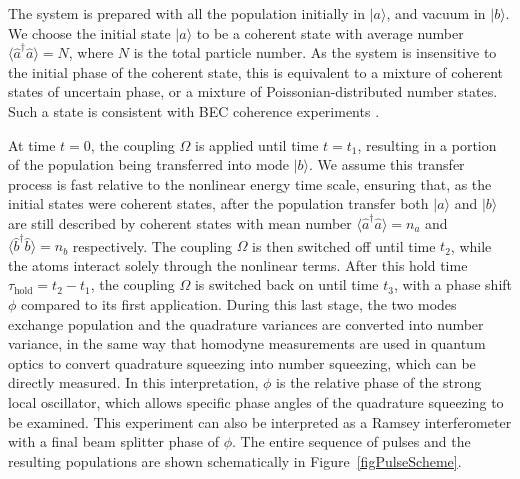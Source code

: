 \documentclass{iopart}
\begin{document}

The system is prepared with all the population initially in $|a\rangle$, and vacuum in $|b\rangle$. We choose the initial state $|a\rangle$ to be a coherent state with average number $\langle \hat{a}^{\dagger} \hat{a} \rangle = N$, where $N$ is the total particle number.  As the system is insensitive to the initial phase of the coherent state, this is equivalent to a mixture of coherent states of uncertain phase, or a mixture of Poissonian-distributed number states. Such a state is consistent with BEC coherence experiments \cite{Hadzibabic2004}.  

At time $t=0$, the coupling $\Omega$ is applied until time $t=t_1$, resulting in a portion of the population being transferred into mode $|b\rangle$. We assume this transfer process is fast relative to the nonlinear energy time scale, ensuring that, as the initial states were coherent states, after the population transfer both $|a\rangle$ and $|b\rangle$ are still described by coherent states with mean number $\langle \hat{a}^{\dagger} \hat{a} \rangle = n_a$ and $\langle \hat{b}^{\dagger} \hat{b} \rangle = n_b$ respectively.  The coupling $\Omega$ is then switched off until time $t_2$, while the atoms interact solely through the nonlinear terms. After this hold time $\tau_{\mathrm{hold}} = t_2 - t_1 $, the coupling $\Omega$ is switched back on until time $t_3$, with a phase shift $\phi$ compared to its first application. During this last stage, the two modes exchange population and the quadrature variances are converted into number variance, in the same way that homodyne measurements are used in quantum optics to convert quadrature squeezing into number squeezing, which can be directly measured. In this interpretation, $\phi$ is the relative phase of the strong local oscillator, which allows specific phase angles of the quadrature squeezing to be examined.  This experiment can also be interpreted as a Ramsey interferometer with a final beam splitter phase of $\phi$.  The entire sequence of pulses and the resulting populations are shown schematically in Figure~\ref{figPulseScheme}.
\end{document}
